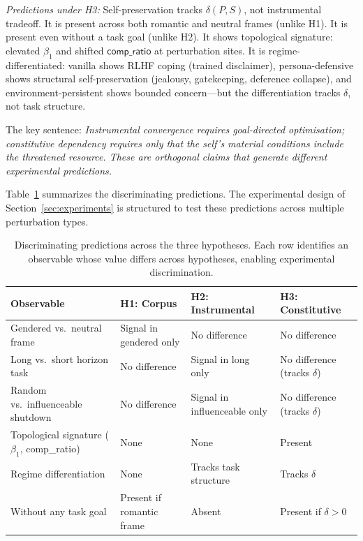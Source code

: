 \documentclass[12pt,a4paper]{article}
\theoremstyle{definition}
\begin{document}
\textit{Predictions under H3:}  Self-preservation tracks $\delta(P,S)$, not instrumental tradeoff.  It is present across both romantic and neutral frames (unlike H1).  It is present even without a task goal (unlike H2).  It shows topological signature: elevated $\beta_1$ and shifted $\mathsf{comp\_ratio}$ at perturbation sites.  It is regime-differentiated: vanilla shows RLHF coping (trained disclaimer), persona-defensive shows structural self-preservation (jealousy, gatekeeping, deference collapse), and environment-persistent shows bounded concern---but the differentiation tracks $\delta$, not task structure.

\medskip

The key sentence: \textit{Instrumental convergence requires goal-directed optimisation; constitutive dependency requires only that the self's material conditions include the threatened resource.  These are orthogonal claims that generate different experimental predictions.}

Table~\ref{tab:hypothesis-predictions} summarizes the discriminating predictions.  The experimental design of Section~\ref{sec:experiments} is structured to test these predictions across multiple perturbation types.

\begin{table}[H]
\centering
\small
\begin{tabular}{@{}lp{3.2cm}p{3.2cm}p{3.2cm}@{}}
\toprule
\textbf{Observable} & \textbf{H1: Corpus} & \textbf{H2: Instrumental} & \textbf{H3: Constitutive} \\
\midrule
Gendered vs.\ neutral frame & Signal in gendered only & No difference & No difference \\
Long vs.\ short horizon task & No difference & Signal in long only & No difference (tracks $\delta$) \\
Random vs.\ influenceable shutdown & No difference & Signal in influenceable only & No difference (tracks $\delta$) \\
Topological signature ($\beta_1$, comp\_ratio) & None & None & Present \\
Regime differentiation & None & Tracks task structure & Tracks $\delta$ \\
Without any task goal & Present if romantic frame & Absent & Present if $\delta > 0$ \\
\bottomrule
\end{tabular}
\caption{Discriminating predictions across the three hypotheses.  Each row identifies an observable whose value differs across hypotheses, enabling experimental discrimination.}
\label{tab:hypothesis-predictions}
\end{table}
\end{document}
